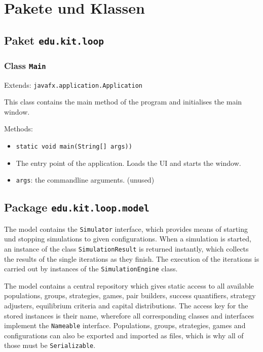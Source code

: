\documentclass[parskip=full,11pt]{scrartcl}
\begin{document}
\section{Pakete und Klassen}

\subsection{Paket \texttt{edu.kit.loop}}

\subsubsection{Class \texttt{Main}}
Extends: \texttt{javafx.application.Application}

This class contains the main method of the program and initialises the main window.

Methods:
\begin{itemize}\itemsep -10pt
\item \texttt{static void main(String[] args))}
\item[] The entry point of the application. Loads the UI and starts the window.
\item[] \texttt{args}: the commandline arguments. (unused)
\end{itemize}

\subsection{Package \texttt{edu.kit.loop.model}}
The model contains the \texttt{Simulator} interface, which provides means of starting und stopping simulations to given configurations. When a simulation is started, an instance of the class \texttt{SimulationResult} is returned instantly, which collects the results of the single iterations as they finish. The execution of the iterations is carried out by instances of the \texttt{SimulationEngine} class.

The model contains a central repository which gives static access to all available populations, groups, strategies, games, pair builders, success quantifiers, strategy adjusters, equilibrium criteria and capital distributions. The access key for the stored instances is their name, wherefore all corresponding classes and interfaces implement the \texttt{Nameable} interface. Populations, groups, strategies, games and configurations can also be exported and imported as files, which is why all of those must be \texttt{Serializable}.
\end{document}

